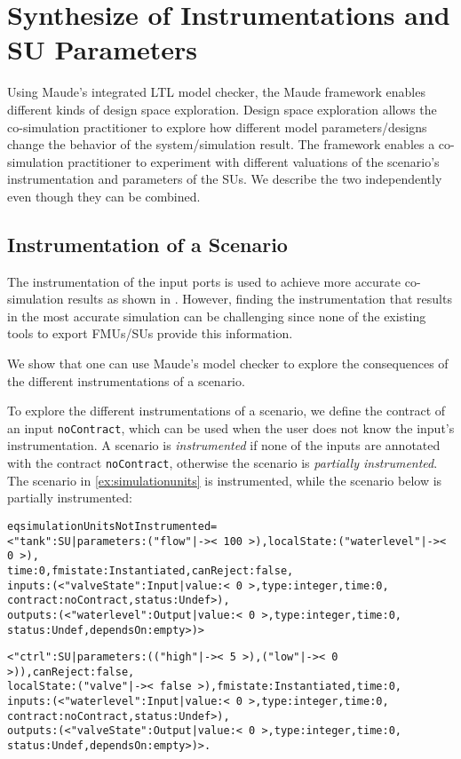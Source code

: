 
\section{Synthesize of Instrumentations and SU Parameters}\label{sc:DSE}
Using Maude's integrated LTL model checker, the Maude framework enables different kinds of design space exploration.
Design space exploration allows the co-simulation practitioner to explore how different model parameters/designs change the behavior of the system/simulation result.
The framework enables a co-simulation practitioner to experiment with different valuations of the scenario's instrumentation and parameters of the SUs.
We describe the two independently even though they can be combined.

\subsection{Instrumentation of a Scenario}
The instrumentation of the input ports is used to achieve more accurate co-simulation results as shown in \cite{Gomes2019,Oakes2021,hansen_verification_2021}.
However, finding the instrumentation that results in the most accurate simulation can be challenging since none of the existing tools to export FMUs/SUs provide this information.

We show that one can use Maude's model checker to explore the consequences of the different instrumentations of a scenario.

To explore the different instrumentations of a scenario, we define the contract of an input \texttt{noContract}, which can be used when the user does not know the input's instrumentation.
A scenario is \emph{instrumented} if none of the inputs are annotated with the contract \texttt{noContract}, otherwise the scenario is \emph{partially instrumented}.
The scenario in \cref{ex:simulationunits} is instrumented, while the scenario below is partially instrumented:
\scriptsize
\begin{alltt}
eq simulationUnitsNotInstrumented = 
< "tank" : SU | parameters : ("flow" |-> <\,100\,>),  localState : ("waterlevel" |-> <\,0\,>),
                time : 0,  fmistate : Instantiated, canReject : false, 
                inputs : (< "valveState" : Input | value : <\,0\,>, type : integer, time : 0,
                                                    contract : noContract, status : Undef >), 
                outputs : (< "waterlevel" : Output | value : <\,0\,>, type : integer, time : 0,
                                                      status : Undef, dependsOn : empty >) >

< "ctrl" : SU | parameters : (("high" |-> <\,5\,>) , ("low" |-> <\,0\,>)), canReject : false, 
                localState : ("valve" |-> <\,false\,>), fmistate : Instantiated, time : 0, 
                inputs : (< "waterlevel" : Input | value : <\,0\,>, type : integer, time : 0,
                                                    contract : noContract, status : Undef >), 
                outputs : (< "valveState" : Output | value : <\,0\,>, type : integer, time : 0,
                                                      status : Undef, dependsOn : empty >) > . 

\end{alltt}
\normalsize


